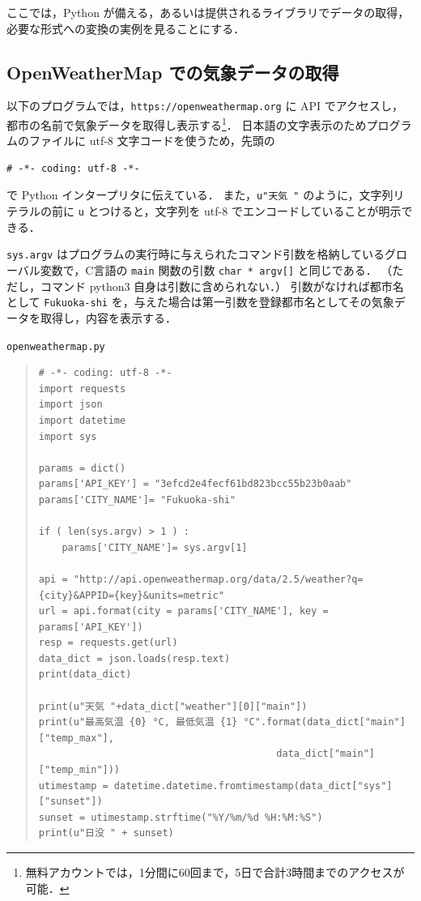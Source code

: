 \documentclass[11pt,a4,epsf]{report}
\begin{document}
ここでは，Python が備える，あるいは提供されるライブラリでデータの取得，必要な形式への変換の実例を見ることにする．

\subsection{OpenWeatherMap での気象データの取得}

以下のプログラムでは，\verb+https://openweathermap.org+ に API でアクセスし，都市の名前で気象データを取得し表示する\footnote{無料アカウントでは，1分間に60回まで，5日で合計3時間までのアクセスが可能．}．
日本語の文字表示のためプログラムのファイルに utf-8 文字コードを使うため，先頭の
\begin{verbatim}
# -*- coding: utf-8 -*-
\end{verbatim}
で Python インタープリタに伝えている．
また，\verb+u"天気 "+  のように，文字列リテラルの前に \verb+u+ とつけると，文字列を utf-8 でエンコードしていることが明示できる．

\verb+sys.argv+ はプログラムの実行時に与えられたコマンド引数を格納しているグローバル変数で，C言語の \verb+main+ 関数の引数 \verb+char * argv[]+ と同じである．
（ただし，コマンド python3 自身は引数に含められない．）
引数がなければ都市名として \verb+Fukuoka-shi+ を，与えた場合は第一引数を登録都市名としてその気象データを取得し，内容を表示する．

\begin{itembox}[l]{\tt openweathermap.py}
\begin{quote}
\small
\begin{verbatim}
# -*- coding: utf-8 -*-
import requests
import json
import datetime
import sys

params = dict()
params['API_KEY'] = "3efcd2e4fecf61bd823bcc55b23b0aab"
params['CITY_NAME']= "Fukuoka-shi"

if ( len(sys.argv) > 1 ) :
    params['CITY_NAME']= sys.argv[1]

api = "http://api.openweathermap.org/data/2.5/weather?q={city}&APPID={key}&units=metric"
url = api.format(city = params['CITY_NAME'], key = params['API_KEY'])
resp = requests.get(url)
data_dict = json.loads(resp.text)
print(data_dict)

print(u"天気 "+data_dict["weather"][0]["main"])
print(u"最高気温 {0} °C, 最低気温 {1} °C".format(data_dict["main"]["temp_max"], 
                                         data_dict["main"]["temp_min"]))
utimestamp = datetime.datetime.fromtimestamp(data_dict["sys"]["sunset"])
sunset = utimestamp.strftime("%Y/%m/%d %H:%M:%S")
print(u"日没 " + sunset)
\end{verbatim}
\end{quote}
\end{itembox}
\end{document}
